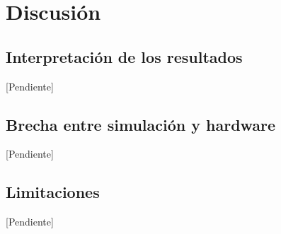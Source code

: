 \chapter{Discusión}
\label{cap:discusion}

\section{Interpretación de los resultados}
[Pendiente]

\section{Brecha entre simulación y hardware}
[Pendiente]

\section{Limitaciones}
[Pendiente]
